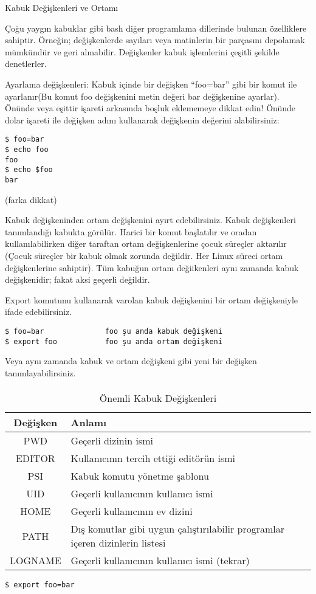 \begin{section}{Kabuk Değişkenleri ve Ortamı}

Çoğu yaygın kabuklar gibi bash diğer programlama dillerinde bulunan özelliklere sahiptir. Örneğin; değişkenlerde sayıları veya matinlerin bir parçasını depolamak mümkündür ve geri alınabilir. Değişkenler kabuk işlemlerini çeşitli şekilde denetlerler.

Ayarlama değişkenleri: Kabuk içinde bir değişken “foo=bar” gibi bir komut ile ayarlanır(Bu komut foo değişkenini metin değeri bar değişkenine ayarlar). Önünde veya eşittir işareti arkasında boşluk eklememeye dikkat edin! Önünde dolar işareti ile değişken adını kullanarak değişkenin değerini alabilirsiniz:
\begin{verbatim}
$ foo=bar
$ echo foo
foo
$ echo $foo
bar
\end{verbatim} 
 
(farka dikkat)

Kabuk değişkeninden ortam değişkenini ayırt edebilirsiniz. Kabuk değişkenleri tanımlandığı kabukta görülür. Harici bir komut başlatılır ve oradan kullanılabilirken diğer taraftan ortam değişkenlerine çocuk süreçler aktarılır (Çocuk süreçler bir kabuk olmak zorunda değildir. Her Linux süreci ortam değişkenlerine sahiptir). Tüm kabuğun ortam değiikenleri aynı zamanda kabuk değişkenidir; fakat aksi geçerli değildir.

Export komutunu kullanarak varolan kabuk değişkenini bir ortam değişkeniyle ifade edebilirsiniz.
\begin{verbatim}
$ foo=bar              foo şu anda kabuk değişkeni
$ export foo           foo şu anda ortam değişkeni
\end{verbatim}

Veya aynı zamanda kabuk ve ortam değişkeni gibi yeni bir değişken tanımlayabilirsiniz.

\paragraph{}{
\begin {table}[H]
\caption {Önemli Kabuk Değişkenleri} \label{tab:title} 
\begin{tabular}{c l}
\hline
Değişken & Anlamı\\
\hline
PWD		&  Geçerli dizinin ismi\\
EDITOR		&  Kullanıcının tercih ettiği editörün ismi\\
PSI	&	  Kabuk komutu yönetme şablonu\\
UID		&  Geçerli kullanıcının kullanıcı ismi\\
HOME		&  Geçerli kullanıcının ev dizini\\
PATH		&  Dış komutlar gibi uygun çalıştırılabilir programlar içeren dizinlerin listesi\\
LOGNAME	  & Geçerli kullanıcının kullanıcı ismi (tekrar)\\
\hline
\end{tabular}
\end {table}}
\begin{verbatim}
$ export foo=bar
\end{verbatim}


\end{section}
